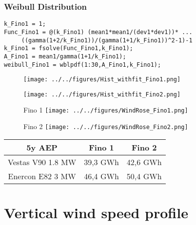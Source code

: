 \documentclass[12pt,t]{beamer}
\begin{document}
\begin{frame}[fragile]
\frametitle{Weibull Distribution}
\begin{lstlisting}
k_Fino1 = 1;
Func_Fino1 = @(k_Fino1) (mean1*mean1/(dev1*dev1))* ...
     ((gamma(1+2/k_Fino1))/(gamma(1+1/k_Fino1))^2-1)-1 
k_Fino1 = fsolve(Func_Fino1,k_Fino1);
A_Fino1 = mean1/gamma(1+1/k_Fino1);
weibull_Fino1 = wblpdf(1:30,A_Fino1,k_Fino1);
\end{lstlisting}
\begin{figure}[htbp]
	\begin{center}
		\begin{minipage}[t]{0.49\linewidth}
			\centering
		  \texttt{[image: ../../figures/Hist\_withfit\_Fino1.png]}
			\label{histo1}
		\end{minipage}
		\begin{minipage}[t]{0.49\linewidth}
		  \centering
		  \texttt{[image: ../../figures/Hist\_withfit\_Fino2.png]}
			\label{histo2}
		\end{minipage}
	\end{center}
\end{figure}
\end{frame}

\begin{frame}
\begin{figure}[htbp]
	\begin{center}
		\begin{minipage}[t]{0.45\linewidth}
			\centering
			Fino 1
			\texttt{[image: ../../figures/WindRose\_Fino1.png]}
			
			
		\end{minipage}
		\begin{minipage}[t]{0.45\linewidth}
			\centering
			Fino 2
			\texttt{[image: ../../figures/WindRose\_Fino2.png]}

		\end{minipage}
	\end{center}
\end{figure}
\begin{tabular}{c| c| c}
			5y AEP 	& Fino 1 & Fino 2 \\ 
				\hline
			Vestas V90 1.8 MW & 39,3 GWh & 42,6 GWh \\
			\hline
			Enercon E82 3 MW& 46,4 GWh & 50,4 GWh \\
			\end{tabular}
\end{frame}


\section{Vertical wind speed profile}
\end{document}
